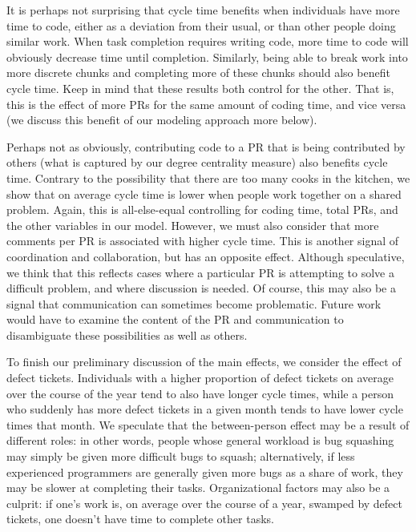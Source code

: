\documentclass[
  sn-mathphys-ay,
]{sn-jnl}
\begin{document}
It is perhaps not surprising that cycle time benefits when individuals
have more time to code, either as a deviation from their usual, or than
other people doing similar work. When task completion requires writing
code, more time to code will obviously decrease time until completion.
Similarly, being able to break work into more discrete chunks and
completing more of these chunks should also benefit cycle time. Keep in
mind that these results both control for the other. That is, this is the
effect of more PRs for the same amount of coding time, and vice versa
(we discuss this benefit of our modeling approach more below).

Perhaps not as obviously, contributing code to a PR that is being
contributed by others (what is captured by our degree centrality
measure) also benefits cycle time. Contrary to the possibility that
there are too many cooks in the kitchen, we show that on average cycle
time is lower when people work together on a shared problem. Again, this
is all-else-equal controlling for coding time, total PRs, and the other
variables in our model. However, we must also consider that more
comments per PR is associated with higher cycle time. This is another
signal of coordination and collaboration, but has an opposite effect.
Although speculative, we think that this reflects cases where a
particular PR is attempting to solve a difficult problem, and where
discussion is needed. Of course, this may also be a signal that
communication can sometimes become problematic. Future work would have
to examine the content of the PR and communication to disambiguate these
possibilities as well as others.

To finish our preliminary discussion of the main effects, we consider
the effect of defect tickets. Individuals with a higher proportion of
defect tickets on average over the course of the year tend to also have
longer cycle times, while a person who suddenly has more defect tickets
in a given month tends to have lower cycle times that month. We
speculate that the between-person effect may be a result of different
roles: in other words, people whose general workload is bug squashing
may simply be given more difficult bugs to squash; alternatively, if
less experienced programmers are generally given more bugs as a share of
work, they may be slower at completing their tasks. Organizational
factors may also be a culprit: if one's work is, on average over the
course of a year, swamped by defect tickets, one doesn't have time to
complete other tasks.
\end{document}
